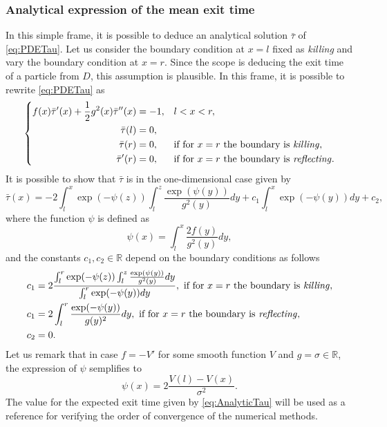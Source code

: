 \subsubsection{Analytical expression of the mean exit time}
In this simple frame, it is possible to deduce an analytical solution $\bar\tau$ of \eqref{eq:PDETau}. Let us consider the boundary condition at $x=l$ fixed as \textit{killing} and vary the boundary condition at $x=r$. Since the scope is deducing the exit time of a particle from $D$, this assumption is plausible. In this frame, it is possible to rewrite \eqref{eq:PDETau} as
\begin{equation}\label{eq:ODETau}
\left \{
\begin{aligned}
	f(x)\bar\tau'(x) + \frac{1}{2} g^2(x) \bar\tau''(x) &= -1, && l < x < r, \\
	\bar\tau(l) &= 0, \\
	\bar\tau(r) &= 0, && \text{if for $x = r$ the boundary is \textit{killing}}, \\
	\bar\tau'(r) &= 0, && \text{if for $x = r$ the boundary is \textit{reflecting}}. 
\end{aligned} \right .
\end{equation}
It is possible to show \cite{Krumscheid2015,Pavliotis2014} that $\bar\tau$ is in the one-dimensional case given by
\begin{equation}\label{eq:AnalyticTau}
	\bar\tau(x) = -2 \int_l^x \exp(-\psi(z)) \int_l^z \frac{\exp(\psi(y))}{g^2(y)}dy + c_1 \int_l^x \exp(-\psi(y))dy + c_2,
\end{equation}
where the function $\psi$ is defined as
\begin{equation}\label{eq:psi}
	\psi(x) = \int_l^x \frac{2f(y)}{g^2(y)}dy,
\end{equation}
and the constants $c_1,c_2 \in \mathbb{R}$ depend on the boundary conditions as follows
\begin{align}\label{eq:Constants}
\begin{split}
	c_1 &= 2\frac{\int_l^r \exp(-\psi(z)) \int_l^z \frac{\exp(\psi(y))}{g^2(y)}dy}{\int_l^r \exp(-\psi(y))dy}, \text{  if for $x = r$ the boundary is \textit{killing}}, \\
	c_1 &= 2\int_l^r \frac{\exp(-\psi(y))}{g(y)^2}dy, \text{  if for $x = r$ the boundary is \textit{reflecting}}, \\
	c_2 &= 0.
\end{split}
\end{align}
Let us remark that in case $f = -V'$ for some smooth function $V$ and $g = \sigma \in \mathbb{R}$, the expression of $\psi$ semplifies to
\begin{equation}\label{eq:psiSemplified}
	\psi(x) = 2\frac{V(l)-V(x)}{\sigma^2}.
\end{equation}
The value for the expected exit time given by \eqref{eq:AnalyticTau} will be used as a reference for verifying the order of convergence of the numerical methods.
